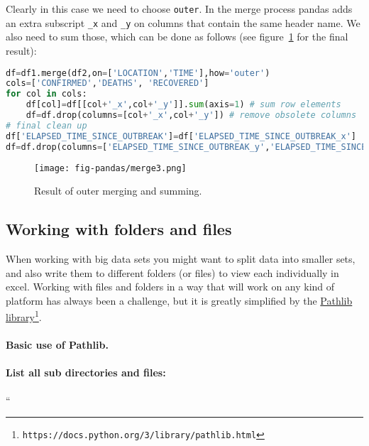 \documentclass[graybox,sectrefs,envcountresetchap,open=right,final]{svmonodo}
\begin{document}
Clearly in this case we need to choose \texttt{outer}. In the merge process pandas adds an extra subscript \Verb!_x! and \Verb!_y! on columns that contain the same header name. We also need to sum those, which can be done as follows
(see figure~\ref{fig:pandas:merge3} for the final result):










\begin{lstlisting}[language=python,style=blue1bar]
df=df1.merge(df2,on=['LOCATION','TIME'],how='outer')
cols=['CONFIRMED','DEATHS', 'RECOVERED']
for col in cols:
    df[col]=df[[col+'_x',col+'_y']].sum(axis=1) # sum row elements
    df=df.drop(columns=[col+'_x',col+'_y']) # remove obsolete columns
# final clean up
df['ELAPSED_TIME_SINCE_OUTBREAK']=df['ELAPSED_TIME_SINCE_OUTBREAK_x']		
df=df.drop(columns=['ELAPSED_TIME_SINCE_OUTBREAK_y','ELAPSED_TIME_SINCE_OUTBREAK_x'])

\end{lstlisting}


\begin{figure}[!ht]  %
  \centerline{\texttt{[image: fig-pandas/merge3.png]}}
  \caption{
  Result of outer merging and summing. \label{fig:pandas:merge3}
  }
\end{figure}

\subsection{Working with folders and files}
When working with big data sets you might want to split data into smaller sets, and also write them to different folders (or files) to view each individually in excel. Working with files and folders in a way that will work on any kind of platform has always been a challenge, but it is greatly simplified by the \href{{https://docs.python.org/3/library/pathlib.html}}{Pathlib library}\footnote{\texttt{https://docs.python.org/3/library/pathlib.html}}.

\paragraph{Basic use of Pathlib.}
\paragraph{List all sub directories and files:}
``
\end{document}
